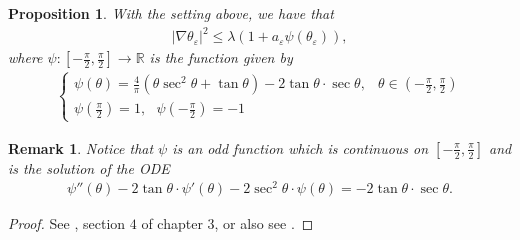\documentclass[11pt]{amsart}
\newtheorem{proposition}[theorem]{Proposition}
\newtheorem{remark}[prop]{Remark}
\begin{document}
\begin{proposition}\label{oo}
With the setting above, we have that \begin{align}\label{zzzzz}
    \vert\nabla\theta_\varepsilon\vert^2\leq \lambda(1+a_\varepsilon\psi(\theta_\varepsilon)),
\end{align}where $\psi:\left[-\frac{\pi}{2},\frac{\pi}{2}\right]\to\mathbb{R}$ is the function given by
\begin{align*}
        \left\{\begin{array}{lc}
             \psi(\theta)=\frac{4}{\pi}(\theta\sec^2\theta+\tan\theta)-2\tan\theta\cdot\sec\theta,& \theta\in\left(-\frac{\pi}{2},\frac{\pi}{2}\right) \\
             \psi\left(\frac{\pi}{2}\right)=1,\text{ }\psi\left(-\frac{\pi}{2}\right)=-1& 
        \end{array}\right.
    \end{align*}
\end{proposition}
\begin{remark}
   Notice that $\psi$ is an odd function which is continuous on $\left[-\frac{\pi}{2},\frac{\pi}{2}\right]$ and is the solution of the ODE
    \begin{align}\label{o}
        \psi''(\theta)-2\tan\theta\cdot\psi'(\theta)-2\sec^2\theta\cdot \psi(\theta)=-2\tan\theta\cdot\sec\theta.
    \end{align}
\end{remark}
 


\begin{proof}
See \cite{schoenyau}, section $4$ of chapter $3$, or also see \cite{hangwang}.

 \end{proof}   
\end{document}
